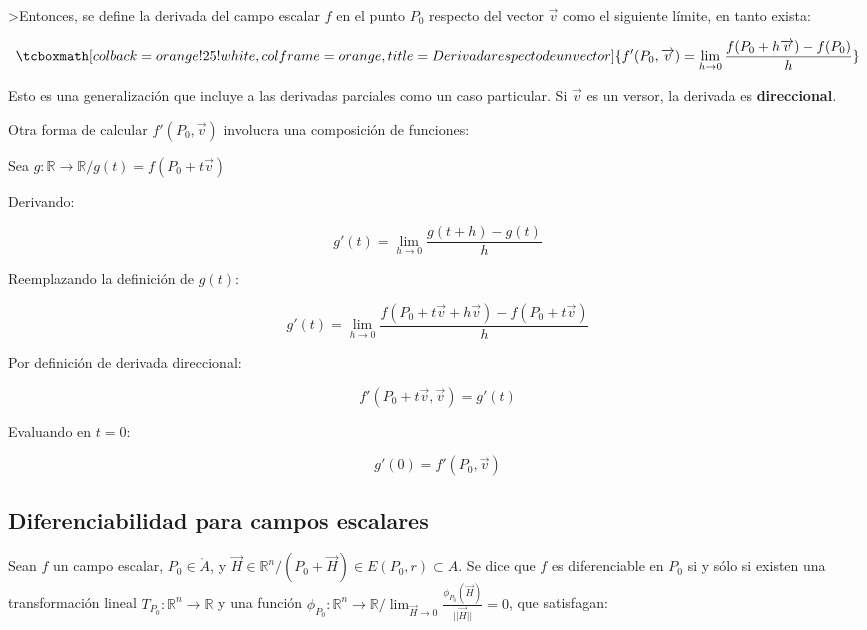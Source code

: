 \documentclass{article}
\renewcommand{\Bbb}{\mathbb}
\begin{document}
>Entonces, se define la derivada del campo escalar $f$ en el punto $P_0$ respecto del vector $\overrightarrow{v}$ como el siguiente límite, en tanto exista:

\begin{equation}
\tcboxmath[colback=orange!25!white,colframe=orange, title=Derivada respecto de un vector]
{ f'(P_0, \overrightarrow{v}) = \lim_{h \rightarrow 0} \frac{f(P_0 + h \overrightarrow{v})-f(P_0)}{h} }
\end{equation}

Esto es una generalización que incluye a las derivadas parciales como un caso particular. Si $\overrightarrow{v}$ es un versor, la derivada es \textbf{direccional}.

Otra forma de calcular $f'(P_0, \overrightarrow{v})$ involucra una composición de funciones:


Sea $g:\Bbb R \rightarrow \Bbb R / g(t) = f(P_0 + t \overrightarrow{v})$

Derivando:

\begin{equation}
g'(t) = \lim_{h \rightarrow 0} \frac{g(t+h)-g(t)}{h}
\end{equation}

Reemplazando la definición de $g(t)$:

\begin{equation}
g'(t) = \lim_{h \rightarrow 0} \frac{f(P_0 + t \overrightarrow{v} + h \overrightarrow{v}) - f(P_0 + t \overrightarrow{v})}{h}
\end{equation}

Por definición de derivada direccional:

\begin{equation}
f'(P_0 + t \overrightarrow{v}, \overrightarrow{v}) = g'(t) 
\end{equation}

Evaluando en $t = 0$:

\begin{equation}
g'(0) = f'(P_0, \overrightarrow{v})
\end{equation}

\subsection{Diferenciabilidad para campos escalares}

Sean $f$ un campo escalar, $P_0 \in \mathring{A}$, y $\overrightarrow{H} \in \Bbb R^n / (P_0 + \overrightarrow{H}) \in E(P_0, r) \subset A$. Se dice que $f$ es diferenciable en $P_0$ si y sólo si existen una transformación lineal $T_{P_0}: \Bbb R^n \rightarrow \Bbb R$ y una función $\phi_{P_0}: \Bbb R^n \rightarrow \Bbb R / \lim_{\overrightarrow{H} \rightarrow 0} \frac{\phi_{P_0}(\overrightarrow{H})}{||\overrightarrow{H}||} = 0$, que satisfagan:
\end{document}
